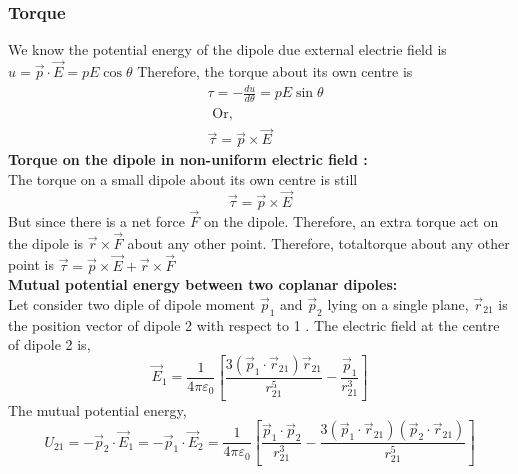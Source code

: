 \subsubsection{Torque}
We know the potential energy of the dipole due external electrie field is $u=\vec{p} \cdot \vec{E}=p E \cos \theta$
Therefore, the torque about its own centre is
$$
\begin{aligned}
&\tau=-\frac{d u}{d \theta}=p E \sin \theta\\
&\text { Or, }\\
&\vec{\tau}=\vec{p} \times \vec{E}
\end{aligned}
$$
\textbf{Torque on the dipole in non-uniform electric field :}\\
The torque on a small dipole about its own centre is still
$$
\vec{\tau}=\vec{p} \times \vec{E}
$$
But since there is a net force $\vec{F}$ on the dipole.
Therefore, an extra torque act on the dipole is $\vec{r} \times \vec{F}$ about any other point.
Therefore, totaltorque about any other point is $\vec{\tau}=\vec{p} \times \vec{E}+\vec{r} \times \vec{F}$\\
\textbf{Mutual potential energy between two coplanar dipoles:}\\
Let consider two diple of dipole moment $\vec{p}_{1}$ and $\vec{p}_{2}$ lying on a single plane, $\vec{r}_{21}$ is the position vector of dipole
2 with respect to 1 . The electric field at the centre of dipole 2 is,
$$
\vec{E}_{1}=\frac{1}{4 \pi \varepsilon_{0}}\left[\frac{3\left(\vec{p}_{1} \cdot \vec{r}_{21}\right) \vec{r}_{21}}{r_{21}^{5}}-\frac{\vec{p}_{1}}{r_{21}^{3}}\right]
$$
The mutual potential energy,
$$
U_{21}=-\vec{p}_{2} \cdot \vec{E}_{1}=-\vec{p}_{1} \cdot \vec{E}_{2}=\frac{1}{4 \pi \varepsilon_{0}}\left[\frac{\vec{p}_{1} \cdot \vec{p}_{2}}{r_{21}^{3}}-\frac{3\left(\vec{p}_{1} \cdot \vec{r}_{21}\right)\left(\vec{p}_{2} \cdot \vec{r}_{21}\right)}{r_{21}^{5}}\right]
$$

